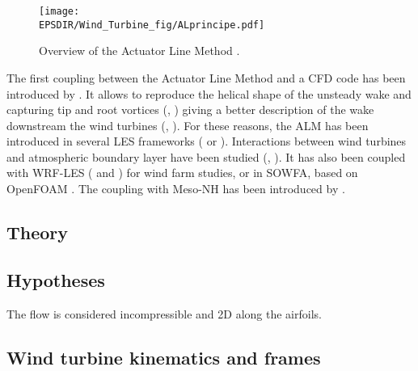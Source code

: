 \begin{figure}[h]
\centering
\texttt{[image: \\EPSDIR/Wind\_Turbine\_fig/ALprincipe.pdf]}
\caption{Overview of the Actuator Line Method \citep{joulin2019modelisation}.}  
\label{fig:AL_principe}
\end{figure}
\medbreak
The first coupling between the Actuator Line Method and a CFD code has been introduced by \cite{mikkelsen2003actuator}. It allows to reproduce the helical shape of the unsteady wake and capturing tip and root vortices (\citep{ivanell2007numerical}, \citep{ivanell2007numericalv}) giving a better description of the wake downstream the wind turbines (\cite{Ivanell2009}, \cite{Troldborg2009}).
\medbreak
For these reasons, the ALM has been introduced in several LES frameworks (\cite{porte2011large} or \cite{tabib2017near}). Interactions between wind turbines and atmospheric boundary layer have been studied (\cite{lu2011large}, \cite{lu2015impact}). It has also been coupled with WRF-LES (\cite{marjanovic2015simulation} and \cite{marjanovic2017implementation}) for wind farm studies, or in SOWFA, based on OpenFOAM  \citep{Churchfield2012}. The coupling with Meso-NH has been introduced by \cite{joulin2020theactuator}.


\subsection{Theory}
\subsection{Hypotheses}
\label{ss:hypALM}
The flow is considered incompressible and 2D along the airfoils.

\subsection*{Wind turbine kinematics and frames}		
\label{ss:EOL_M_cinematiqueAL}


